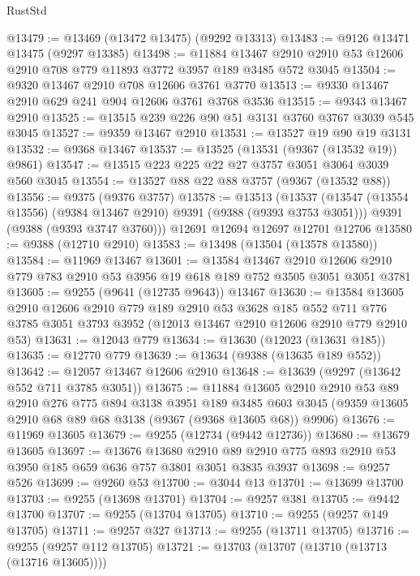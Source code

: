 \begin{lexlean}{RustStd}
\begin{coremodule}
@13479 := @13469 (@13472 @13475) (@9292 @13313)
@13483 := @9126 @13471 @13475 (@9297 @13385)
@13498 := @11884
    @13467
    @2910
    @2910
    @53
    @12606
    @2910
    @708
    @779
    @11893
    @3772
    @3957
    @189
    @3485
    @572
    @3045
@13504 := @9320 @13467 @2910 @708 @12606 @3761 @3770
@13513 := @9330 @13467 @2910 @629 @241 @904 @12606 @3761 @3768 @3536
@13515 := @9343 @13467 @2910
@13525 := @13515 @239 @226 @90 @51 @3131 @3760 @3767 @3039 @545 @3045
@13527 := @9359 @13467 @2910
@13531 := @13527 @19 @90 @19 @3131
@13532 := @9368 @13467
@13537 := @13525 (@13531 (@9367 (@13532 @19)) @9861)
@13547 := @13515 @223 @225 @22 @27 @3757 @3051 @3064 @3039 @560 @3045
@13554 := @13527 @88 @22 @88 @3757 (@9367 (@13532 @88))
@13556 := @9375 (@9376 @3757)
@13578 := @13513
    (@13537
      (@13547 (@13554 @13556) (@9384 @13467 @2910) @9391 (@9388 (@9393 @3753 @3051)))
      @9391
      (@9388 (@9393 @3747 @3760)))
    @12691
    @12694
    @12697
    @12701
    @12706
@13580 := @9388 (@12710 @2910)
@13583 := @13498 (@13504 (@13578 @13580))
@13584 := @11969 @13467
@13601 := @13584
    @13467
    @2910
    @12606
    @2910
    @779
    @783
    @2910
    @53
    @3956
    @19
    @618
    @189
    @752
    @3505
    @3051
    @3051
    @3781
@13605 := @9255 (@9641 (@12735 @9643)) @13467
@13630 := @13584
    @13605
    @2910
    @12606
    @2910
    @779
    @189
    @2910
    @53
    @3628
    @185
    @552
    @711
    @776
    @3785
    @3051
    @3793
    @3952
    (@12013 @13467 @2910 @12606 @2910 @779 @2910 @53)
@13631 := @12043 @779
@13634 := @13630 (@12023 (@13631 @185))
@13635 := @12770 @779
@13639 := @13634 (@9388 (@13635 @189 @552))
@13642 := @12057 @13467 @12606 @2910
@13648 := @13639 (@9297 (@13642 @552 @711 @3785 @3051))
@13675 := @11884
    @13605
    @2910
    @2910
    @53
    @89
    @2910
    @276
    @775
    @894
    @3138
    @3951
    @189
    @3485
    @603
    @3045
    (@9359 @13605 @2910 @68 @89 @68 @3138 (@9367 (@9368 @13605 @68)) @9906)
@13676 := @11969 @13605
@13679 := @9255 (@12734 (@9442 @12736))
@13680 := @13679 @13605
@13697 := @13676
    @13680
    @2910
    @89
    @2910
    @775
    @893
    @2910
    @53
    @3950
    @185
    @659
    @636
    @757
    @3801
    @3051
    @3835
    @3937
@13698 := @9257 @526
@13699 := @9260 @53
@13700 := @3044 @13
@13701 := @13699 @13700
@13703 := @9255 (@13698 @13701)
@13704 := @9257 @381
@13705 := @9442 @13700
@13707 := @9255 (@13704 @13705)
@13710 := @9255 (@9257 @149 @13705)
@13711 := @9257 @327
@13713 := @9255 (@13711 @13705)
@13716 := @9255 (@9257 @112 @13705)
@13721 := @13703 (@13707 (@13710 (@13713 (@13716 @13605))))

\end{coremodule}
\end{lexlean}
